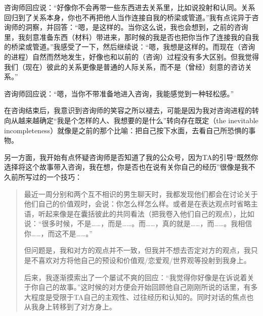 咨询师回应说：“好像你不会再带一些东西进去关系里，比如说投射和认同。关系回归到了关系本身，你也不再把他人当作连接自我的桥梁或管道。”我有点诧异于咨询师的洞察，并回答：“嗯，是这样的。当你这么说，我也会想到，之前的咨询里，我刻意准备东西（材料）带进来，那时候的我是否也把你当作了连接我的自我的桥梁或管道。”我感受了一下，然后继续说：“嗯，我想是这样的。而现在（咨询的进程）自然而然地发生，好像也和以前的（咨询）过程没有多大区别。但我觉得我们（现在）彼此的关系更像是普通的人际关系，而不是（曾经）刻意的咨访关系。”

咨询师回应说：“嗯，当你不带准备地进入咨询，我能感觉到一种轻松感。”

\tristarsepline

在咨询结束后，我意识到咨询师的笑容之所以褪去，可能是因为我对咨询进程的转向\pozhehao{}从越来越确定“我是个怎样的人、我想要的是什么”转向存在既定（the inevitable incompleteness）\pozhehao{}就像是之前的那个比喻：把自己按下水面，去看自己所恐惧的事物。

另一方面，我开始有点怀疑咨询师是否知道了我的公众号，因为TA的引导“既然你选择将这个故事带入咨询，我在想，你是否也在说有关你自己的经历”很像是我不久前所写过的一个技巧：


\blockquote{
最近一周分别和两个互不相识的男生聊天时，我都发现他们都会在讨论关于他们自己的价值观时，会说：你怎么样怎么样。或者是在表达观点时省略主语，听起来像是在囊括彼此的共同看法（把我卷入他们自己的观点），比如说：“很多时候，不是……，而是……。而……，真的就是……，而……。我相信你……，而这不是……。”

但问题是，我和对方的观点并不一致，但我并不想去否定对方的观点，我只是不喜欢对方将他自己的预设和价值观/恋爱观/世界观等投射到我身上。

后来，我逐渐摸索出了一个屡试不爽的回应：“我觉得你好像是在诉说着关于你自己的故事。”这时候的对方便会开始回顾他自己刚刚所说的话里，有多大程度是受限于TA自己的主观性、过往经历和认知的。同时对话的焦点也从我身上转移到了对方身上。

}
